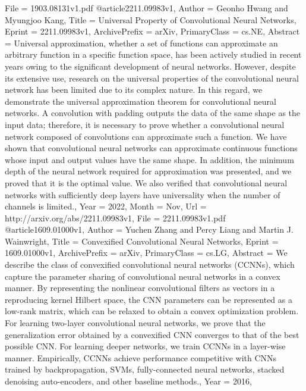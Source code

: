 {{{{File          = {1903.08131v1.pdf}
}
@article{2211.09983v1,
Author        = {Geonho Hwang and Myungjoo Kang},
Title         = {Universal Property of Convolutional Neural Networks},
Eprint        = {2211.09983v1},
ArchivePrefix = {arXiv},
PrimaryClass  = {cs.NE},
Abstract      = {Universal approximation, whether a set of functions can approximate an
arbitrary function in a specific function space, has been actively studied in
recent years owing to the significant development of neural networks. However,
despite its extensive use, research on the universal properties of the
convolutional neural network has been limited due to its complex nature. In
this regard, we demonstrate the universal approximation theorem for
convolutional neural networks. A convolution with padding outputs the data of
the same shape as the input data; therefore, it is necessary to prove whether a
convolutional neural network composed of convolutions can approximate such a
function. We have shown that convolutional neural networks can approximate
continuous functions whose input and output values have the same shape. In
addition, the minimum depth of the neural network required for approximation
was presented, and we proved that it is the optimal value. We also verified
that convolutional neural networks with sufficiently deep layers have
universality when the number of channels is limited.},
Year          = {2022},
Month         = {Nov},
Url           = {http://arxiv.org/abs/2211.09983v1},
File          = {2211.09983v1.pdf}
}
@article{1609.01000v1,
Author        = {Yuchen Zhang and Percy Liang and Martin J. Wainwright},
Title         = {Convexified Convolutional Neural Networks},
Eprint        = {1609.01000v1},
ArchivePrefix = {arXiv},
PrimaryClass  = {cs.LG},
Abstract      = {We describe the class of convexified convolutional neural networks (CCNNs),
which capture the parameter sharing of convolutional neural networks in a
convex manner. By representing the nonlinear convolutional filters as vectors
in a reproducing kernel Hilbert space, the CNN parameters can be represented as
a low-rank matrix, which can be relaxed to obtain a convex optimization
problem. For learning two-layer convolutional neural networks, we prove that
the generalization error obtained by a convexified CNN converges to that of the
best possible CNN. For learning deeper networks, we train CCNNs in a layer-wise
manner. Empirically, CCNNs achieve performance competitive with CNNs trained by
backpropagation, SVMs, fully-connected neural networks, stacked denoising
auto-encoders, and other baseline methods.},
Year          = {2016},
}}}}
